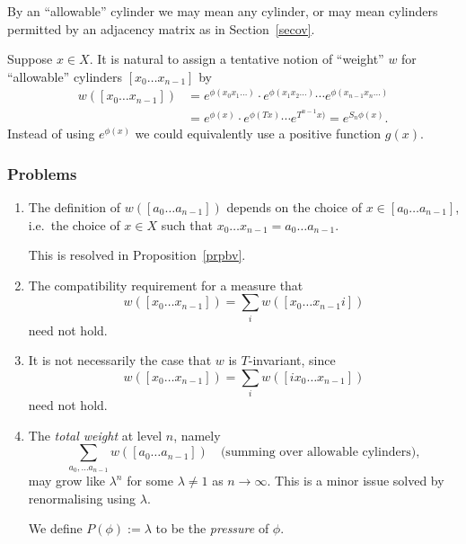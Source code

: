 \documentclass[a4paper]{amsart}
\theoremstyle{plain}
\theoremstyle{definition}
\theoremstyle{remark}
\begin{document}
By an ``allowable'' cylinder we may mean any cylinder, or may mean cylinders permitted by an adjacency matrix as in  Section~\ref{secov}.

Suppose $ x \in X $.  It is natural  to assign a tentative notion of  ``weight'' $ w $ for ``allowable'' cylinders $  [x_0\dots x_{n-1}] $  
by
\begin{equation} \label{defw}
\begin{aligned} 	 
w([x_0\dots x_{n-1}])  &=  e^{\phi(x_0x_1\dots)} \cdot  e^{\phi(x_1x_2\dots)} 
                                     \cdots e^{\phi(x_{n-1}x_n\dots)}  \\
              &= e^{\phi(x)}\cdot e^{\phi(Tx)}\cdots e^{T^{n-1}x)}  
           = e^{ S_n \phi  (x) }.
  \end{aligned} 
\end{equation} 
Instead of using $ e^{\phi(x)} $ we could equivalently use a positive function $ g(x) $.  
             
\subsubsection{Problems} \mbox{}
\begin{enumerate}

\item The definition of $ w([a_0\dots a_{n-1}]) $ depends on the choice of $ x \in [a_0\dots a_{n-1}]$, i.e.\ the choice of $ x\in X $  such that $ x_0\dots x_{n-1} = a_0\dots a_{n-1}$.

This is resolved in Proposition~\ref{prpbv}.
\item The compatibility requirement for a measure that 
\[
w([x_0\dots x_{n-1}]) = \sum_i w([x_0\dots x_{n-1}i])
\]
need not hold.
\item It is not necessarily the case that $ w $ is $ T $-invariant, since
\[  w([x_0\dots x_{n-1}]) =  \sum_i w([ix_0\dots x_{n-1}]) 
\]
need not hold.

\item The \emph{total weight} at level $ n $, namely
\[ \sum_{a_0,\dots a_{n-1}} w([a_0\dots a_{n-1}])    \quad \text{(summing over allowable cylinders)}, \]
may grow like $ \lambda ^n $ for some $ \lambda \neq 1 $ as $ n \to \infty $.  This is a minor issue solved by renormalising using $ \lambda  $.

We define $ P(\phi) := \lambda$ to be the \emph{pressure} of $ \phi $.
\end{enumerate} 
\end{document}
